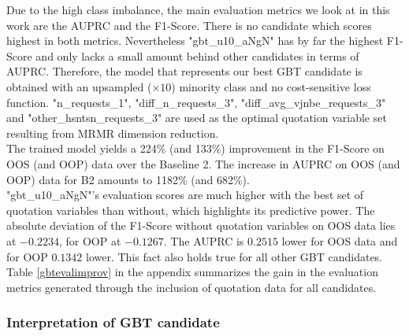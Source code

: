 \documentclass[12pt,titlepage]{article}
\begin{document}
Due to the high class imbalance, the main evaluation metrics we look at in this work are the AUPRC and the F1-Score. There is no candidate which scores highest in both metrics. Nevertheless "gbt\_u10\_aNgN" has by far the highest F1-Score and only lacks a small amount behind other candidates in terms of AUPRC. Therefore, the model that represents our best GBT candidate is obtained with an upsampled ($\times 10$) minority class and no cost-sensitive loss function. "n\_requests\_1", "diff\_n\_requests\_3", "diff\_avg\_vjnbe\_requests\_3" and "other\_hsntsn\_requests\_3" are used as the optimal quotation variable set resulting from MRMR dimension reduction. \\
The trained model yields a 224\% (and 133\%) improvement in the F1-Score on OOS (and OOP) data over the Baseline 2. The increase in AUPRC on OOS (and OOP) data for B2 amounts to 1182\% (and 682\%). \\
"gbt\_u10\_aNgN"'s evaluation scores are much higher with the best set of quotation variables than without, which highlights its predictive power. The absolute deviation of the F1-Score without quotation variables on OOS data lies at $-0.2234$, for OOP at $-0.1267$. The AUPRC is $0.2515$ lower for OOS data and for OOP $0.1342$ lower. This fact also holds true for all other GBT candidates. Table \ref{gbtevalimprov} in the appendix summarizes the gain in the evaluation metrics generated through the inclusion of quotation data for all candidates. \\

\subsubsection*{Interpretation of GBT candidate}
\end{document}
